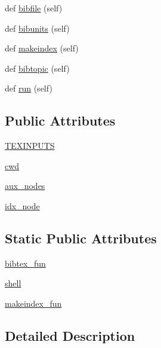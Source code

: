 \begin{DoxyCompactItemize}
\item 
def \hyperlink{classwaflib_1_1_tools_1_1tex_1_1tex_a84f06095e6adb078c76849aaad9caaa7}{bibfile} (self)
\item 
def \hyperlink{classwaflib_1_1_tools_1_1tex_1_1tex_adc9975ca42cc99bdfed2453d0501deb7}{bibunits} (self)
\item 
def \hyperlink{classwaflib_1_1_tools_1_1tex_1_1tex_a037e014ad6faffb9d86bce5a13038776}{makeindex} (self)
\item 
def \hyperlink{classwaflib_1_1_tools_1_1tex_1_1tex_a91f60e48f7933bde8c62a1108c408f84}{bibtopic} (self)
\item 
def \hyperlink{classwaflib_1_1_tools_1_1tex_1_1tex_a9ca231d8975e3c1d5d3c9e455f31f892}{run} (self)
\end{DoxyCompactItemize}
\subsection*{Public Attributes}
\begin{DoxyCompactItemize}
\item 
\hyperlink{classwaflib_1_1_tools_1_1tex_1_1tex_a0b539752e47fa4b38d3cacec38657203}{T\+E\+X\+I\+N\+P\+U\+TS}
\item 
\hyperlink{classwaflib_1_1_tools_1_1tex_1_1tex_aacbd540fcc58959f6daf2784fdf7b905}{cwd}
\item 
\hyperlink{classwaflib_1_1_tools_1_1tex_1_1tex_a868e4651ff58e02b5b973c862722a4a6}{aux\+\_\+nodes}
\item 
\hyperlink{classwaflib_1_1_tools_1_1tex_1_1tex_a6cf97e22895b3af44fb90f0d6d23f4a2}{idx\+\_\+node}
\end{DoxyCompactItemize}
\subsection*{Static Public Attributes}
\begin{DoxyCompactItemize}
\item 
\hyperlink{classwaflib_1_1_tools_1_1tex_1_1tex_a74c2efb8f0b3451e74e1a1f61213d1df}{bibtex\+\_\+fun}
\item 
\hyperlink{classwaflib_1_1_tools_1_1tex_1_1tex_a78da1827366f5e413b04098026c05d3d}{shell}
\item 
\hyperlink{classwaflib_1_1_tools_1_1tex_1_1tex_a94767fefe1d8d436b7e95ecb3c4c7b6a}{makeindex\+\_\+fun}
\end{DoxyCompactItemize}


\subsection{Detailed Description}


